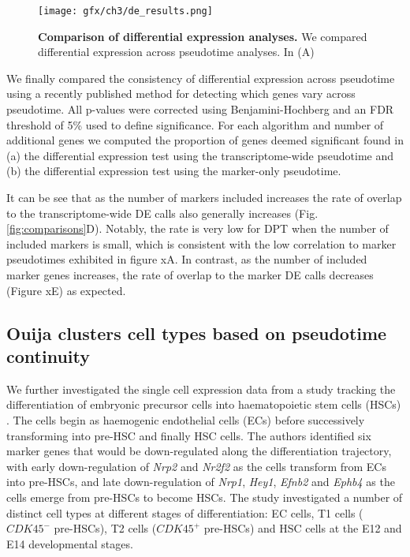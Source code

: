 {\begin{figure}%
	\centering
	\texttt{[image: gfx/ch3/de\_results.png]}
	\caption{\textbf{Comparison of differential expression analyses.} We compared differential expression across pseudotime analyses. In (A)  }
	\label{fig:de_results}
\end{figure}

We finally compared the consistency of differential expression across pseudotime using a recently published method for detecting which genes vary across pseudotime. All p-values were corrected using Benjamini-Hochberg and an FDR threshold of 5\% used to define significance. For each algorithm and number of additional genes we computed the proportion of genes deemed significant found in (a) the differential expression test using the transcriptome-wide pseudotime and (b) the differential expression test using the marker-only pseudotime.

It can be see that as the number of markers included increases the rate of overlap to the transcriptome-wide DE calls also generally increases (Fig. \ref{fig:comparisons}D). Notably, the rate is very low for DPT when the number of included markers is small, which is consistent with the low correlation to marker pseudotimes exhibited in figure xA. In contrast, as the number of included marker genes increases, the rate of overlap to the marker DE calls decreases (Figure xE) as expected.

}

\subsection{Ouija clusters cell types based on pseudotime continuity}

We further investigated the single cell expression data from a study tracking the differentiation of embryonic precursor cells into haematopoietic stem cells (HSCs) \cite{zhou2016tracing}. The cells begin as haemogenic endothelial cells (ECs) before successively transforming  into pre-HSC and finally HSC cells. The authors identified six marker genes that would be down-regulated along the differentiation trajectory, with early down-regulation of \emph{Nrp2} and \emph{Nr2f2} as the cells transform from ECs into pre-HSCs, and late down-regulation of \emph{Nrp1}, \emph{Hey1}, \emph{Efnb2} and \emph{Ephb4} as the cells emerge from pre-HSCs to become HSCs. The study investigated a number of distinct cell types at different stages of differentiation: EC cells, T1 cells ($CDK45^-$ pre-HSCs), T2 cells ($CDK45^+$ pre-HSCs) and HSC cells at the E12 and E14 developmental stages.

